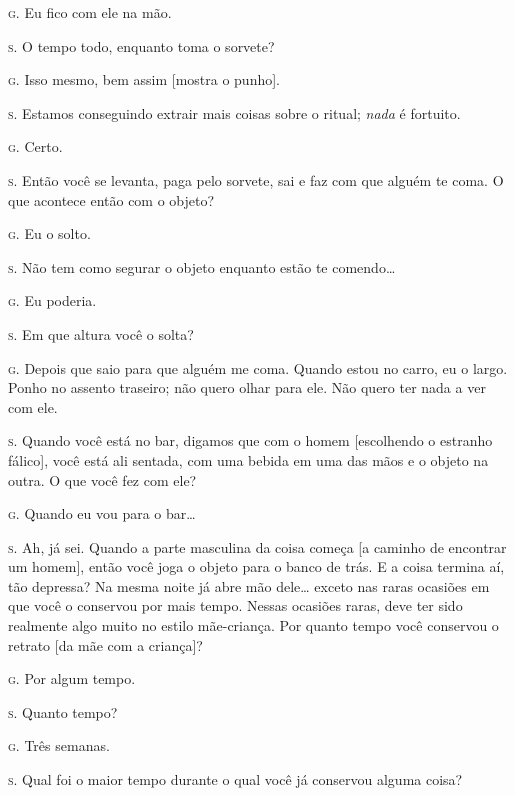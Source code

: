 \noindent\hskip0mm\textsc{g.} Eu fico com ele na mão.

\noindent\hskip0mm\textsc{s.} O tempo todo, enquanto toma o sorvete?

\noindent\hskip0mm\textsc{g.} Isso mesmo, bem assim [mostra o punho].

\noindent\hskip0mm\textsc{s.} Estamos conseguindo extrair mais coisas sobre o ritual; \textit{nada}
é fortuito.

\noindent\hskip0mm\textsc{g.} Certo.

\noindent\hskip0mm\textsc{s.} Então você se levanta, paga pelo sorvete, sai e faz com que alguém te
coma. O que acontece então com o objeto?

\noindent\hskip0mm\textsc{g.} Eu o solto.

\noindent\hskip0mm\textsc{s.} Não tem como segurar o objeto enquanto estão te comendo\ldots{}

\noindent\hskip0mm\textsc{g.} Eu poderia.

\noindent\hskip0mm\textsc{s.} Em que altura você o solta?

\noindent\hskip0mm\textsc{g.} Depois que saio para que alguém me coma. Quando estou no carro, eu o
largo. Ponho no assento traseiro; não quero olhar para ele. Não quero
ter nada a ver com ele.

\noindent\hskip0mm\textsc{s.} Quando você está no bar, digamos que com o homem [escolhendo o
estranho fálico], você está ali sentada, com uma bebida em uma das mãos
e o objeto na outra. O que você fez com ele?

\noindent\hskip0mm\textsc{g.} Quando eu vou para o bar\ldots{}

\noindent\hskip0mm\textsc{s.} Ah, já sei. Quando a parte masculina da coisa começa [a caminho de
encontrar um homem], então você joga o objeto para o banco de trás. E
a coisa termina aí, tão depressa? Na mesma noite já abre mão dele\ldots{}
exceto nas raras ocasiões em que você o conservou por mais tempo.
Nessas ocasiões raras, deve ter sido realmente algo muito no estilo
mãe-criança. Por quanto tempo você conservou o retrato [da mãe com a
criança]?

\noindent\hskip0mm\textsc{g.} Por algum tempo.

\noindent\hskip0mm\textsc{s.} Quanto tempo?

\noindent\hskip0mm\textsc{g.} Três semanas.

\noindent\hskip0mm\textsc{s.} Qual foi o maior tempo durante o qual você já conservou alguma coisa?

